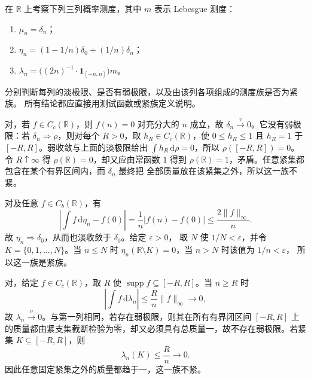 \BookExercises


\begin{exercise}\label{b1:ex:12-basic-limits-tightness}
在 \(\mathbb R\) 上考察下列三列概率测度，其中 \(m\) 表示 Lebesgue 测度：
\begin{enumerate}
\item\label{b1:item:12-basic-dirac}\(\mu_n=\delta_n\)；
\item\label{b1:item:12-basic-small-escape}
\(\eta_n=(1-1/n)\delta_0+(1/n)\delta_n\)；
\item\label{b1:item:12-basic-spreading}
\(\lambda_n=\bigl((2n)^{-1}\cdot\mathbf1_{[-n,n]}\bigr)m\)。
\end{enumerate}
分别判断每列的淡极限、是否有弱极限，以及由该列各项组成的测度族是否为紧族。
所有结论都应直接用测试函数或紧族定义说明。
\end{exercise}
\begin{solution}
对，若 \(f\in C_c(\mathbb R)\)，则 \(f(n)=0\) 对充分大的
\(n\) 成立，故 \(\delta_n\xrightarrow{v}0\)。它没有弱极限：若
\(\delta_n\Rightarrow\rho\)，则对每个 \(R>0\)，取 \(h_R\in C_c(\mathbb R)\)，使
\(0\leq h_R\leq1\) 且 \(h_R=1\) 于 \([-R,R]\)。弱收敛与上面的淡极限给出
\(\int h_R\,\mathrm d\rho=0\)，所以 \(\rho([-R,R])=0\)。令 \(R\uparrow\infty\) 得
\(\rho(\mathbb R)=0\)，却又应由常函数 \(1\) 得到
\(\rho(\mathbb R)=1\)，矛盾。任意紧集都包含在某个有界区间内，而 \(\delta_n\) 最终把
全部质量放在该紧集之外，所以这一族不紧。

对及任意 \(f\in C_b(\mathbb R)\)，有
\[
 \left|\int f\,\mathrm d\eta_n-f(0)\right|
 =\frac1n|f(n)-f(0)|\leq\frac{2\|f\|_\infty}{n}.
\]
故 \(\eta_n\Rightarrow\delta_0\)，从而也淡收敛于 \(\delta_0\)。给定 \(\varepsilon>0\)，
取 \(N\) 使 \(1/N<\varepsilon\)，并令 \(K=\{0,1,\ldots,N\}\)。当 \(n\leq N\) 时
\(\eta_n(\mathbb R\setminus K)=0\)，当 \(n>N\) 时该值为 \(1/n<\varepsilon\)，
所以这一族是紧族。

对，给定 \(f\in C_c(\mathbb R)\)，取 \(R\) 使
\(\operatorname{supp}f\subseteq[-R,R]\)。当 \(n\geq R\) 时
\[
 \left|\int f\,\mathrm d\lambda_n\right|
 \leq\frac{R}{n}\|f\|_\infty\longrightarrow0,
\]
故 \(\lambda_n\xrightarrow{v}0\)。与第一列相同，若存在弱极限，则其在所有有界闭区间
\([-R,R]\) 上的质量都由紧支集截断检验为零，却又必须具有总质量一，故不存在弱极限。若紧集
\(K\subseteq[-R,R]\)，则
\[
 \lambda_n(K)\leq\frac{R}{n}\longrightarrow0.
\]
因此任意固定紧集之外的质量都趋于一，这一族不紧。
\end{solution}

